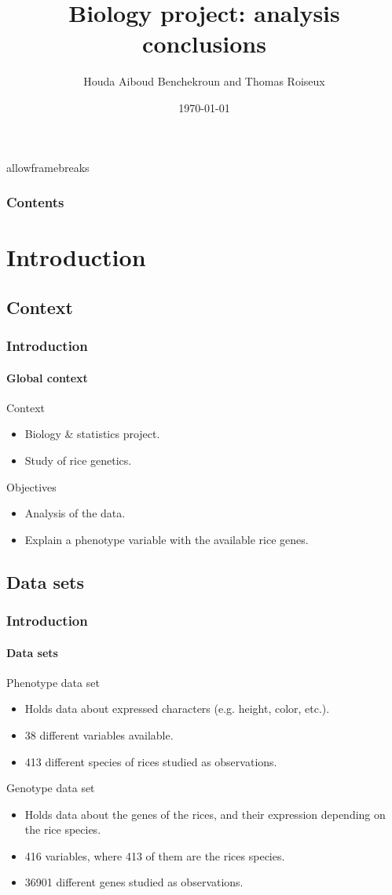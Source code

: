 \documentclass[12pt, english]{beamer}
\title{Biology project: analysis conclusions}
\author{Houda Aiboud Benchekroun and Thomas Roiseux}
\date{\today}
\institute{ENSIIE -- MRR}
\begin{document}
\begin{frame}
    \maketitle
\end{frame}
\begin{frame}{allowframebreaks}
\frametitle{Contents}
\tableofcontents
\end{frame}
\section{Introduction}
\subsection{Context}
\begin{frame}
\frametitle{Introduction}
\framesubtitle{Global context}
\begin{block}{Context}
\begin{itemize}
    \item Biology \& statistics project.
    \item Study of rice genetics.
\end{itemize}
\end{block}
\begin{block}{Objectives}
\begin{itemize}
    \item Analysis of the data.
    \item Explain a phenotype variable with the available rice genes.
\end{itemize}
\end{block}
\end{frame}
\subsection{Data sets}
\begin{frame}
\frametitle{Introduction}
\framesubtitle{Data sets}
\begin{exampleblock}{Phenotype data set}
\begin{itemize}
    \item Holds data about expressed characters (e.g. height, color, etc.).
    \item 38 different variables available.
    \item 413 different species of rices studied as observations.
\end{itemize}
\end{exampleblock}
\begin{exampleblock}{Genotype data set}
\begin{itemize}
    \item Holds data about the genes of the rices, and their expression depending on the rice species.
    \item 416 variables, where 413 of them are the rices species.
    \item 36901 different genes studied as observations.
\end{itemize}
\end{exampleblock}
\end{frame}
\end{document}
